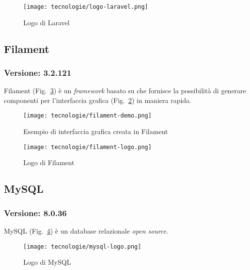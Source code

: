 \begin{figure}[!h] 
  \centering 
  \texttt{[image: tecnologie/logo-laravel.png]} 
  \caption{Logo di Laravel}
  \label{fig:logo-laravel}
\end{figure}

\newpage 

\subsection{\label{tec:Filament}Filament}
\subsubsection{Versione: 3.2.121}
Filament (Fig.~\ref{fig:logo-filament}) è un \emph{\gls{framework}} basato su  che fornisce la possibilità di generare componenti per l'interfaccia grafica (Fig.~\ref{fig:gui-filament}) in maniera rapida.

\begin{figure}[!h] 
  \centering 
  \texttt{[image: tecnologie/filament-demo.png]} 
  \caption{Esempio di interfaccia grafica creata in Filament}
  \label{fig:gui-filament}
\end{figure}

\begin{figure}[!h] 
  \centering 
  \texttt{[image: tecnologie/filament-logo.png]} 
  \caption{Logo di Filament}
  \label{fig:logo-filament}
\end{figure}

\newpage

\subsection{\label{tec:mysql}MySQL}
\subsubsection{Versione: 8.0.36}
MySQL (Fig.~\ref{fig:logo-mysql}) è un database relazionale \emph{\gls{open source}}.

\begin{figure}[!h] 
  \centering 
  \texttt{[image: tecnologie/mysql-logo.png]} 
  \caption{Logo di MySQL}
  \label{fig:logo-mysql}
\end{figure}


